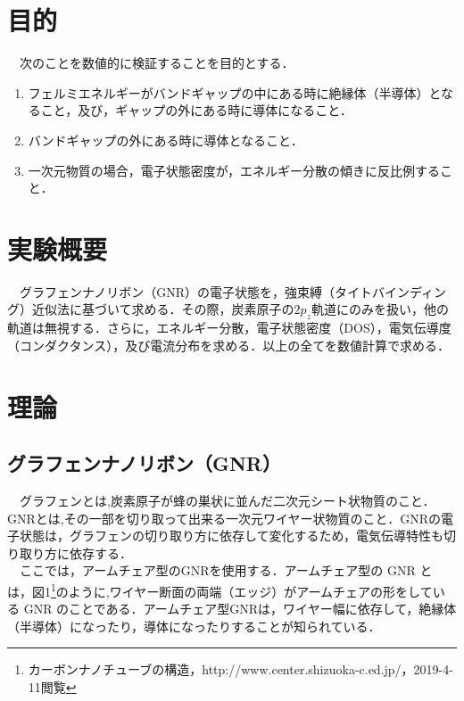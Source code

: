 

\pagestyle{fancy}

\section{目的}
　次のことを数値的に検証することを目的とする．
\begin{enumerate}
  \item フェルミエネルギーがバンドギャップの中にある時に絶縁体（半導体）となること，及び，ギャップの外にある時に導体になること．
  \item バンドギャップの外にある時に導体となること．
  \item 一次元物質の場合，電子状態密度が，エネルギー分散の傾きに反比例すること．
\end{enumerate}

\section{実験概要}
　グラフェンナノリボン（GNR）の電子状態を，強束縛（タイトバインディング）近似法に基づいて求める．その際，炭素原子の$2p_z$軌道にのみを扱い，他の軌道は無視する．さらに，エネルギー分散，電子状態密度（DOS），電気伝導度（コンダクタンス），及び電流分布を求める．以上の全てを数値計算で求める．

\section{理論}
\subsection{グラフェンナノリボン（GNR）}
　グラフェンとは,炭素原子が蜂の巣状に並んだ二次元シート状物質のこと．GNRとは,その一部を切り取って出来る一次元ワイヤー状物質のこと．GNRの電子状態は，グラフェンの切り取り方に依存して変化するため，電気伝導特性も切り取り方に依存する．\\

　ここでは，アームチェア型のGNRを使用する．アームチェア型の GNR とは，図1\footnote{カーボンナノチューブの構造，http://www.center.shizuoka-c.ed.jp/，2019-4-11閲覧}のように,ワイヤー断面の両端（エッジ）がアームチェアの形をしている GNR のことである．アームチェア型GNRは，ワイヤー幅に依存して，絶縁体（半導体）になったり，導体になったりすることが知られている．

